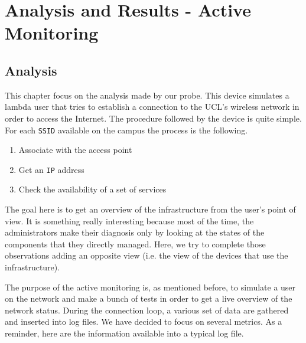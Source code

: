 
\chapter{Analysis and Results - Active Monitoring} %

\label{Chapter6} %





\section{Analysis}
This chapter focus on the analysis made by our probe. This device simulates a lambda user that tries to establish a connection to the UCL's wireless network in order to access the Internet. The procedure followed by the device is quite simple. For each \texttt{SSID} available on the campus the process is the following.

\begin{enumerate}
\item Associate with the access point
\item Get an \texttt{IP} address
\item Check the availability of a set of services
\end{enumerate}

The goal here is to get an overview of the infrastructure from the user's point of view. It is something really interesting because most of the time, the administrators make their diagnosis only by looking at the states of the components that they directly managed. Here, we try to complete those observations adding an opposite view (i.e. the view of the devices that use the infrastructure).

The purpose of the active monitoring is, as mentioned before, to simulate a user on the network and make a bunch of tests in order to get a live overview of the network status. During the connection loop, a various set of data are gathered and inserted into log files. We have decided to focus on several metrics. As a reminder, here are the information available into a typical log file.

